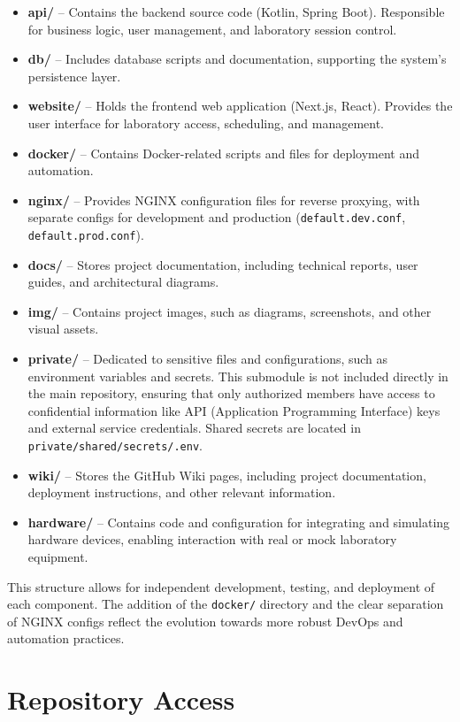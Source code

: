 \documentclass[a4paper,11pt]{report}
\begin{document}
\begin{itemize}
    \item \textbf{api/} – Contains the backend source code (Kotlin, Spring Boot). Responsible for business logic, user management, and laboratory session control.
    \item \textbf{db/} – Includes database scripts and documentation, supporting the system's persistence layer.
    \item \textbf{website/} – Holds the frontend web application (Next.js, React). Provides the user interface for laboratory access, scheduling, and management.
    \item \textbf{docker/} – Contains Docker-related scripts and files for deployment and automation.
    \item \textbf{nginx/} – Provides NGINX configuration files for reverse proxying, with separate configs for development and production (\texttt{default.dev.conf}, \texttt{default.prod.conf}).
    \item \textbf{docs/} – Stores project documentation, including technical reports, user guides, and architectural diagrams.
    \item \textbf{img/} – Contains project images, such as diagrams, screenshots, and other visual assets.
    \item \textbf{private/} – Dedicated to sensitive files and configurations, such as environment variables and secrets. This submodule is not included directly in the main repository, ensuring that only authorized members have access to confidential information like API (Application Programming Interface) keys and external service credentials. Shared secrets are located in \texttt{private/shared/secrets/.env}.
    \item \textbf{wiki/} – Stores the GitHub Wiki pages, including project documentation, deployment instructions, and other relevant information.
    \item \textbf{hardware/} – Contains code and configuration for integrating and simulating hardware devices, enabling interaction with real or mock laboratory equipment.
\end{itemize}

This structure allows for independent development, testing, and deployment of each component. The addition of the \texttt{docker/} directory and the clear separation of NGINX configs reflect the evolution towards more robust DevOps and automation practices.

\section*{Repository Access}
\end{document}
